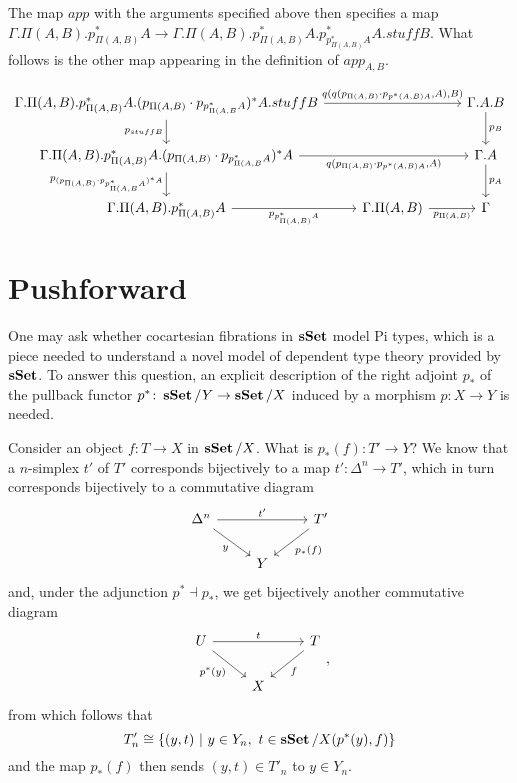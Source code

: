 \documentclass[a4paper,fontsize=12pt]{scrartcl}
\begin{document}
The map $app$ with the arguments specified above then specifies a map
$\Gamma.\Pi(A,B).p^*_{\Pi(A,B)}A\rightarrow\Gamma.\Pi(A,B).p^*_{\Pi(A,B)}A.p^*_{p^*_{\Pi(A,B)}A}A.stuffB$.
What follows is the other map appearing in the definition of $app_{A,B}$.

\[\begin{tikzcd}
	{\Gamma.\Pi(A,B).p^*_{\Pi(A,B)}A.(p_{\Pi(A,B)}\cdot p_{p^*_{\Pi(A,B}A})^*A.stuffB} && {\Gamma.A.B} \\
	{\Gamma.\Pi(A,B).p^*_{\Pi(A,B)}A.(p_{\Pi(A,B)}\cdot p_{p^*_{\Pi(A,B}A})^*A} && {\Gamma.A} \\
	{\Gamma.\Pi(A,B).p^*_{\Pi(A,B)}A} & {\Gamma.\Pi(A,B)} & \Gamma
	\arrow["{q(q(p_{\Pi(A,B)}\cdot p_{p^*(A,B)A},A),B)}", from=1-1, to=1-3]
	\arrow["{p_B}", from=1-3, to=2-3]
	\arrow["{p_A}", from=2-3, to=3-3]
	\arrow["{p_{\Pi(A,B)}}"', from=3-2, to=3-3]
	\arrow["{p_{p^*_{\Pi(A,B)}A}}"', from=3-1, to=3-2]
	\arrow["{q(p_{\Pi(A,B)}\cdot p_{p^*(A,B)A},A)}"', from=2-1, to=2-3]
	\arrow["{p_{(p_{\Pi(A,B)}\cdot p_{p^*_{\Pi(A,B}A})^*A}}"', from=2-1, to=3-1]
	\arrow["{p_{stuffB}}"', from=1-1, to=2-1]
\end{tikzcd}\]

\section{Pushforward}

One may ask whether cocartesian fibrations in $\operatorname{\mathbf{sSet}}$ model Pi types, which is a
piece needed to understand a novel model of dependent type theory provided by
$\operatorname{\mathbf{sSet}}$. To answer this question, an explicit description of the right adjoint
$p_*$ of the pullback functor $p^*\colon\operatorname{\mathbf{sSet}}/Y\rightarrow\operatorname{\mathbf{sSet}}/X$ induced by a
morphism $p\colon X\rightarrow Y$ is needed.

Consider an object $f\colon T\rightarrow X$ in $\operatorname{\mathbf{sSet}}/X$. What is $p_*(f)\colon
T'\rightarrow Y$? We know that a $n$-simplex $t'$ of $T'$ corresponds
bijectively to a map $t'\colon\Delta^n\rightarrow T'$, which in turn corresponds
bijectively to a commutative diagram
\[\begin{tikzcd}
	{\Delta^n} & {} & {T'} \\
	& Y
	\arrow["{t'}", from=1-1, to=1-3]
	\arrow["y"', from=1-1, to=2-2]
	\arrow["{p_*(f)}", from=1-3, to=2-2]
\end{tikzcd}\]
and, under the adjunction $p^*\dashv p_*$, we get bijectively another
commutative diagram
\[\begin{tikzcd}
	U & {} & T \\
	& X
	\arrow["t", from=1-1, to=1-3]
	\arrow["{p^*(y)}"', from=1-1, to=2-2]
	\arrow["f", from=1-3, to=2-2]
\end{tikzcd},\]
from which follows that
\[T'_n\cong\{(y,t)\ |\ y\in Y_n,\ t\in\sSet/X(p^*(y),f)\}\]
and the map $p_*(f)$ then sends $(y,t)\in T'_n$ to $y\in Y_n$.
\end{document}
